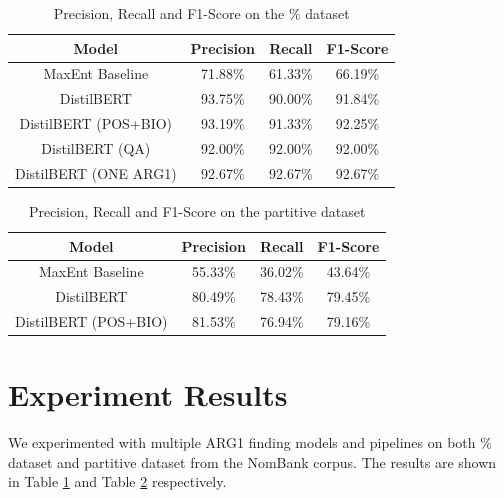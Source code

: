 \documentclass[11pt]{article}
\begin{document}
\begin{table}
  \centering
  \begin{tabular}{c||c|c|c}
    \hline
    \textbf{Model}        & \textbf{Precision} & \textbf{Recall} & \textbf{F1-Score} \\
    \hline
    MaxEnt Baseline       & {71.88\%}          & {61.33\%}       & {66.19\%}         \\
    DistilBERT            & {93.75\%}          & {90.00\%}       & {91.84\%}         \\
    DistilBERT (POS+BIO)  & {93.19\%}          & {91.33\%}       & {92.25\%}         \\
    DistilBERT (QA)       & {92.00\%}          & {92.00\%}       & {92.00\%}         \\
    DistilBERT (ONE ARG1) & {92.67\%}          & {92.67\%}       & {92.67\%}         \\
    \hline
  \end{tabular}
  \caption{Precision, Recall and F1-Score on the \% dataset}
  \label{tab:results-on-first-dataset}
\end{table}

\begin{table}[t]
  \centering
  \begin{tabular}{c||c|c|c}
    \hline
    \textbf{Model}       & \textbf{Precision} & \textbf{Recall} & \textbf{F1-Score} \\
    \hline
    MaxEnt Baseline      & {55.33\%}          & {36.02\%}       & {43.64\%}         \\
    DistilBERT           & {80.49\%}          & {78.43\%}       & {79.45\%}         \\
    DistilBERT (POS+BIO) & {81.53\%}          & {76.94\%}       & {79.16\%}         \\
    \hline
  \end{tabular}
  \caption{Precision, Recall and F1-Score on the partitive dataset}
  \label{tab:results-on-partitive-dataset}
\end{table}

\section{Experiment Results}


We experimented with multiple ARG1 finding models and pipelines on both \% dataset and partitive dataset from the NomBank corpus. The results are shown in Table \ref{tab:results-on-first-dataset} and Table \ref{tab:results-on-partitive-dataset} respectively.
\end{document}
